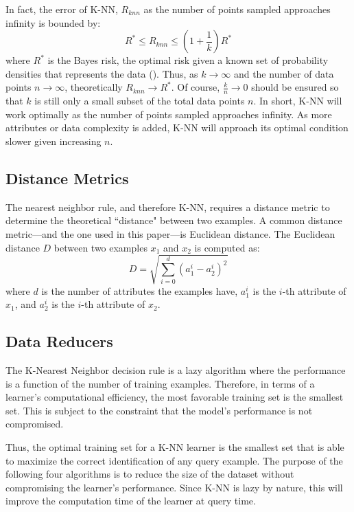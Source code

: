 \documentclass[twoside,11pt]{article}
\begin{document}
In fact, the error of K-NN, $R_{knn}$ as the number of points sampled approaches infinity is bounded by:
$$R^* \leq R_{knn} \leq (1+\frac{1}{k})R^*$$ 
where $R^*$ is the Bayes risk, the optimal risk given a known set of probability densities that represents the data (\cite{NNClassification}). Thus, as $k \rightarrow \infty$ and the number of data points $n \rightarrow \infty$, theoretically $R_{knn} \rightarrow R^*$. Of course, $\frac{k}{n} \rightarrow 0$ should be ensured so that $k$ is still only a small subset of the total data points $n$. In short, K-NN will work optimally as the number of points sampled approaches infinity. As more attributes or data complexity is added, K-NN will approach its optimal condition slower given increasing $n$.


\subsection{Distance Metrics}

The nearest neighbor rule, and therefore K-NN, requires a distance metric to determine the theoretical ``distance" between two examples. A common distance metric---and the one used in this paper---is Euclidean distance. The Euclidean distance $D$ between two examples $x_1$ and $x_2$ is computed as:
$$D = \sqrt{\sum_{i=0}^{d}(a_1^i - a_2^i)^2}$$
where $d$ is the number of attributes the examples have, $a_1^i$ is the $i$-th attribute of $x_1$, and $a_2^i$ is the $i$-th attribute of $x_2$.

\subsection{Data Reducers}
The K-Nearest Neighbor decision rule is a lazy algorithm where the performance is a function of the number of training examples. Therefore, in terms of a learner's computational efficiency, the most favorable training set is the smallest set.
This is subject to the constraint that the model's performance is not compromised.

Thus, the optimal training set for a K-NN learner is the smallest set that is able to maximize the correct identification of any query example.
The purpose of the following four algorithms is to reduce the size of the dataset without compromising the learner's performance. Since K-NN is lazy by nature, this will improve the computation time of the learner at query time.
\end{document}
